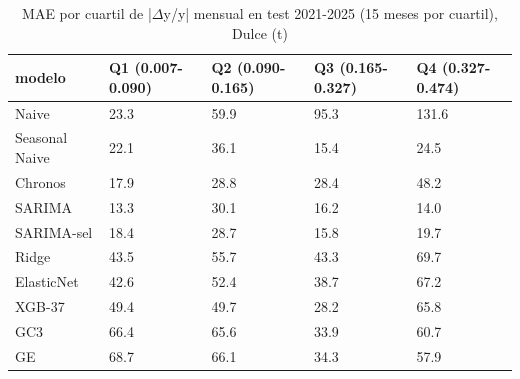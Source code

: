 \begin{table}[H]
\centering
\small
\caption{MAE por cuartil de |$\Delta$y/y| mensual en test 2021-2025 (15 meses por cuartil), Dulce (t)}
\label{tab:T13_cuartiles_dulce}
\begin{tabular}{lllll}
\toprule
modelo & Q1 (0.007-0.090) & Q2 (0.090-0.165) & Q3 (0.165-0.327) & Q4 (0.327-0.474) \\
\midrule
Naive & 23.3 & 59.9 & 95.3 & 131.6 \\
Seasonal Naive & 22.1 & 36.1 & 15.4 & 24.5 \\
Chronos & 17.9 & 28.8 & 28.4 & 48.2 \\
SARIMA & 13.3 & 30.1 & 16.2 & 14.0 \\
SARIMA-sel & 18.4 & 28.7 & 15.8 & 19.7 \\
Ridge & 43.5 & 55.7 & 43.3 & 69.7 \\
ElasticNet & 42.6 & 52.4 & 38.7 & 67.2 \\
XGB-37 & 49.4 & 49.7 & 28.2 & 65.8 \\
GC3 & 66.4 & 65.6 & 33.9 & 60.7 \\
GE & 68.7 & 66.1 & 34.3 & 57.9 \\
\bottomrule
\end{tabular}
\end{table}